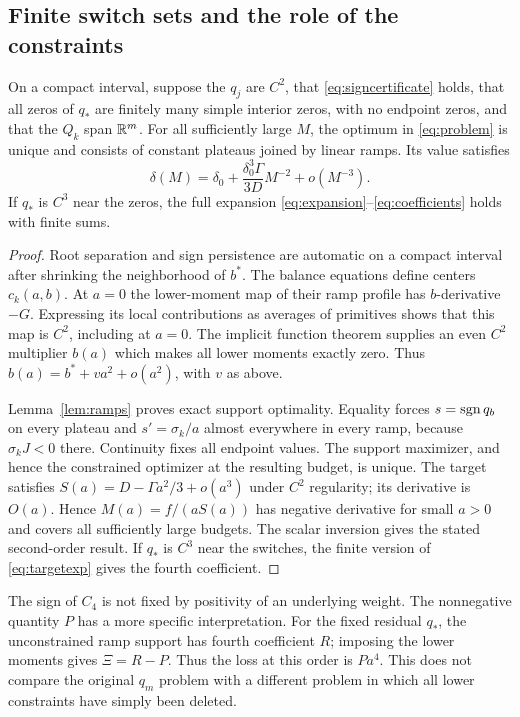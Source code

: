 \subsection{Finite switch sets and the role of the constraints}
\begin{proposition}\label{prop:finite}
On a compact interval, suppose the \(q_j\) are \(C^2\), that
\eqref{eq:signcertificate} holds, that all zeros of \(q_*\) are finitely
many simple interior zeros, with no endpoint zeros, and that the \(Q_k\)
span \(\mathbb R^m\). For all sufficiently large \(M\), the optimum in
\eqref{eq:problem} is unique and consists of constant plateaus joined by
linear ramps. Its value satisfies
\[
 \delta(M)=\delta_0+\frac{\delta_0^3\Gamma}{3D}M^{-2}+o(M^{-3}).
\]
If \(q_*\) is \(C^3\) near the zeros, the full expansion
\eqref{eq:expansion}--\eqref{eq:coefficients} holds with finite sums.
\end{proposition}
\begin{proof}
Root separation and sign persistence are automatic on a compact interval
after shrinking the neighborhood of \(b^*\).
The balance equations define centers \(c_k(a,b)\).
At \(a=0\) the lower-moment map of their ramp profile has \(b\)-derivative
\(-G\). Expressing its local contributions as averages of primitives
shows that this map is \(C^2\), including at \(a=0\).
The implicit function theorem supplies an even \(C^2\) multiplier \(b(a)\)
which makes all lower moments exactly zero.
Thus \(b(a)=b^*+va^2+o(a^2)\), with \(v\) as above.

Lemma~\ref{lem:ramps} proves exact support optimality.
Equality forces \(s=\operatorname{sgn} q_b\) on every plateau and
\(s'=\sigma_k/a\) almost everywhere in every ramp, because
\(\sigma_kJ<0\) there. Continuity fixes all endpoint values.
The support maximizer, and hence the constrained optimizer at the
resulting budget, is unique.
The target satisfies \(S(a)=D-\Gamma a^2/3+o(a^3)\) under \(C^2\)
regularity; its derivative is \(O(a)\).
Hence \(M(a)=f/(aS(a))\) has negative derivative for small \(a>0\)
and covers all sufficiently large budgets. The scalar inversion gives
the stated second-order result. If \(q_*\) is \(C^3\) near the switches,
the finite version of \eqref{eq:targetexp} gives the fourth coefficient.
\end{proof}

\begin{remark}
The sign of \(C_4\) is not fixed by positivity of an underlying weight.
The nonnegative quantity \(P\) has a more specific interpretation.
For the fixed residual \(q_*\), the unconstrained ramp support has
fourth coefficient \(R\); imposing the lower moments gives \(\Xi=R-P\).
Thus the loss at this order is \(Pa^4\).
This does not compare the original \(q_m\) problem with a different
problem in which all lower constraints have simply been deleted.
\end{remark}

